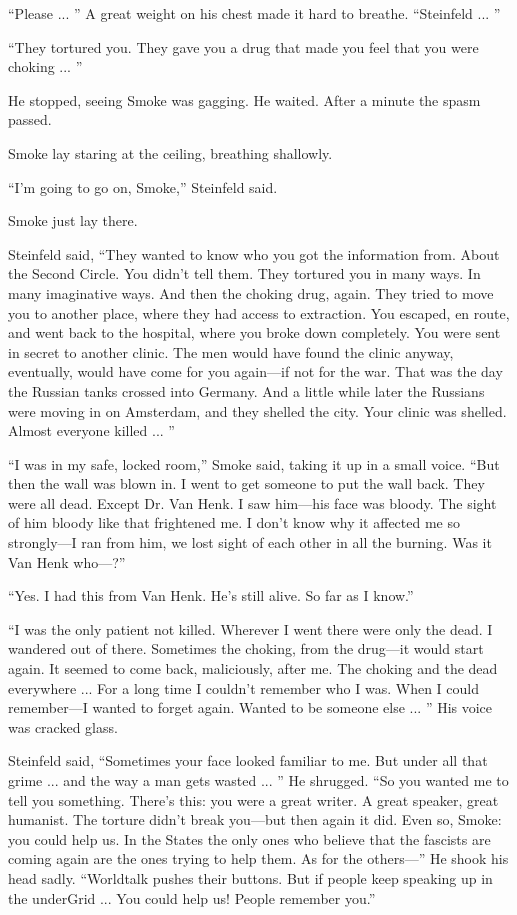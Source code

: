 ``Please ... '' A great weight on his chest made it hard to breathe. ``Steinfeld ... ''

``They tortured you. They gave you a drug that made you feel that you were choking ... ''

He stopped, seeing Smoke was gagging. He waited. After a minute the spasm passed.

Smoke lay staring at the ceiling, breathing shallowly.

``I'm going to go on, Smoke,'' Steinfeld said.

Smoke just lay there.

Steinfeld said, ``They wanted to know who you got the information from. About the Second Circle. You didn't tell them. They tortured you in many ways. In many imaginative ways. And then the choking drug, again. They tried to move you to another place, where they had access to extraction. You escaped, en route, and went back to the hospital, where you broke down completely. You were sent in secret to another clinic. The men would have found the clinic anyway, eventually, would have come for you again—if not for the war. That was the day the Russian tanks crossed into Germany. And a little while later the Russians were moving in on Amsterdam, and they shelled the city. Your clinic was shelled. Almost everyone killed ... ''

``I was in my safe, locked room,'' Smoke said, taking it up in a small voice. ``But then the wall was blown in. I went to get someone to put the wall back. They were all dead. Except Dr. Van Henk. I saw him—his face was bloody. The sight of him bloody like that frightened me. I don't know why it affected me so strongly—I ran from him, we lost sight of each other in all the burning. Was it Van Henk who—?''

``Yes. I had this from Van Henk. He's still alive. So far as I know.''

``I was the only patient not killed. Wherever I went there were only the dead. I wandered out of there. Sometimes the choking, from the drug—it would start again. It seemed to come back, maliciously, after me. The choking and the dead everywhere ... For a long time I couldn't remember who I was. When I could remember—I wanted to forget again. Wanted to be someone else ... '' His voice was cracked glass.

Steinfeld said, ``Sometimes your face looked familiar to me. But under all that grime ... and the way a man gets wasted ... '' He shrugged. ``So you wanted me to tell you something. There's this: you were a great writer. A great speaker, great humanist. The torture didn't break you—but then again it did. Even so, Smoke: you could help us. In the States the only ones who believe that the fascists are coming again are the ones trying to help them. As for the others—'' He shook his head sadly. ``Worldtalk pushes their buttons. But if people keep speaking up in the underGrid ... You could help us! People remember you.''

